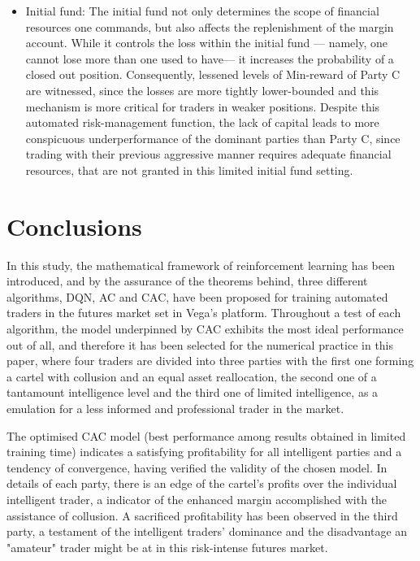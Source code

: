 \documentclass[11pt,twoside]{article}
\numberwithin{Theorem}{section}
\numberwithin{Definition}{section}
\numberwithin{Lemma}{section}
\numberwithin{Algorithm}{section}
\numberwithin{equation}{section}
\begin{document}
\begin{itemize}
    \item Initial fund: The initial fund not only determines the scope of financial resources one commands, but also affects the replenishment of the margin account. While it controls the loss within the initial fund — namely, one cannot lose more than one used to have— it increases the probability of a closed out position. Consequently, lessened levels of Min-reward of Party C are witnessed, since the losses are more tightly lower-bounded and this mechanism is more critical for traders in weaker positions. Despite this automated risk-management function, the lack of capital leads to more conspicuous underperformance of the dominant parties than Party C, since trading with their previous aggressive manner requires adequate financial resources, that are not granted in this limited initial fund setting.
\end{itemize}
\clearpage





\section{Conclusions}
In this study, the mathematical framework of reinforcement learning has been introduced, and by the assurance of the theorems behind, three different algorithms, DQN, AC and CAC, have been proposed for training automated traders in the futures market set in Vega's platform. Throughout a test of each algorithm, the model underpinned by CAC exhibits the most ideal performance out of all, and therefore it has been selected for the numerical practice in this paper, where four traders are divided into three parties with the first one forming a cartel with collusion and an equal asset reallocation, the second one of a tantamount intelligence level and the third one of limited intelligence, as a emulation for a less informed and professional trader in the market.

The optimised CAC model (best performance among results obtained in limited training time) indicates a satisfying profitability for all intelligent parties and a tendency of convergence, having verified the validity of the chosen model. In details of each party, there is an edge of the cartel's profits over the individual intelligent trader, a indicator of the enhanced margin accomplished with the assistance of collusion. A sacrificed profitability has been observed in the third party, a testament of the intelligent traders' dominance and the disadvantage an "amateur" trader might be at in this risk-intense futures market.
\end{document}
